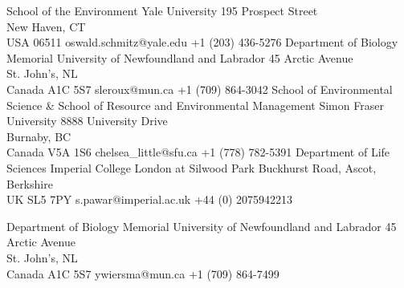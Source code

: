 

\cvdoublecolumn
{
  {School of the Environment}
  {Yale University}
  {195 Prospect Street\\
  New Haven, CT\\
  USA 06511}
  {oswald.schmitz@yale.edu}
  {+1 (203) 436-5276}
}
{
  {Department of Biology}
  {Memorial University of Newfoundland and Labrador}
  {45 Arctic Avenue\\
  St. John's, NL\\
  Canada A1C 5S7}
  {sleroux@mun.ca}
  {+1 (709) 864-3042}
}
{
  {School of Environmental Science \& School of Resource and Environmental Management}
  {Simon Fraser University}
  {8888 University Drive\\
  Burnaby, BC\\
  Canada V5A 1S6}
  {chelsea\_little@sfu.ca}
  {+1 (778) 782-5391}
}
{
  {Department of Life Sciences}
  {Imperial College London at Silwood Park}
  {Buckhurst Road, Ascot, Berkshire\\
  UK SL5 7PY}
  {s.pawar@imperial.ac.uk}
  {+44 (0) 2075942213}
}

{
  {Department of Biology}
  {Memorial University of Newfoundland and Labrador}
  {45 Arctic Avenue\\
  St. John's, NL\\
  Canada A1C 5S7}
  {ywiersma@mun.ca}
  {+1 (709) 864-7499}
}